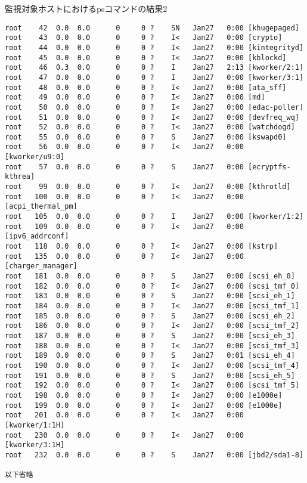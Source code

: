 \begin{itembox}[l]{監視対象ホストにおけるpsコマンドの結果2}
    \begin{verbatim}
root    42  0.0  0.0      0     0 ?    SN   Jan27   0:00 [khugepaged]
root    43  0.0  0.0      0     0 ?    I<   Jan27   0:00 [crypto]
root    44  0.0  0.0      0     0 ?    I<   Jan27   0:00 [kintegrityd]
root    45  0.0  0.0      0     0 ?    I<   Jan27   0:00 [kblockd]
root    46  0.3  0.0      0     0 ?    I    Jan27   2:13 [kworker/2:1]
root    47  0.0  0.0      0     0 ?    I    Jan27   0:00 [kworker/3:1]
root    48  0.0  0.0      0     0 ?    I<   Jan27   0:00 [ata_sff]
root    49  0.0  0.0      0     0 ?    I<   Jan27   0:00 [md]
root    50  0.0  0.0      0     0 ?    I<   Jan27   0:00 [edac-poller]
root    51  0.0  0.0      0     0 ?    I<   Jan27   0:00 [devfreq_wq]
root    52  0.0  0.0      0     0 ?    I<   Jan27   0:00 [watchdogd]
root    55  0.0  0.0      0     0 ?    S    Jan27   0:00 [kswapd0]
root    56  0.0  0.0      0     0 ?    I<   Jan27   0:00 [kworker/u9:0]
root    57  0.0  0.0      0     0 ?    S    Jan27   0:00 [ecryptfs-kthrea]
root    99  0.0  0.0      0     0 ?    I<   Jan27   0:00 [kthrotld]
root   100  0.0  0.0      0     0 ?    I<   Jan27   0:00 [acpi_thermal_pm]
root   105  0.0  0.0      0     0 ?    I    Jan27   0:00 [kworker/1:2]
root   109  0.0  0.0      0     0 ?    I<   Jan27   0:00 [ipv6_addrconf]
root   118  0.0  0.0      0     0 ?    I<   Jan27   0:00 [kstrp]
root   135  0.0  0.0      0     0 ?    I<   Jan27   0:00 [charger_manager]
root   181  0.0  0.0      0     0 ?    S    Jan27   0:00 [scsi_eh_0]
root   182  0.0  0.0      0     0 ?    I<   Jan27   0:00 [scsi_tmf_0]
root   183  0.0  0.0      0     0 ?    S    Jan27   0:00 [scsi_eh_1]
root   184  0.0  0.0      0     0 ?    I<   Jan27   0:00 [scsi_tmf_1]
root   185  0.0  0.0      0     0 ?    S    Jan27   0:00 [scsi_eh_2]
root   186  0.0  0.0      0     0 ?    I<   Jan27   0:00 [scsi_tmf_2]
root   187  0.0  0.0      0     0 ?    S    Jan27   0:00 [scsi_eh_3]
root   188  0.0  0.0      0     0 ?    I<   Jan27   0:00 [scsi_tmf_3]
root   189  0.0  0.0      0     0 ?    S    Jan27   0:01 [scsi_eh_4]
root   190  0.0  0.0      0     0 ?    I<   Jan27   0:00 [scsi_tmf_4]
root   191  0.0  0.0      0     0 ?    S    Jan27   0:00 [scsi_eh_5]
root   192  0.0  0.0      0     0 ?    I<   Jan27   0:00 [scsi_tmf_5]
root   198  0.0  0.0      0     0 ?    I<   Jan27   0:00 [e1000e]
root   199  0.0  0.0      0     0 ?    I<   Jan27   0:00 [e1000e]
root   201  0.0  0.0      0     0 ?    I<   Jan27   0:00 [kworker/1:1H]
root   230  0.0  0.0      0     0 ?    I<   Jan27   0:00 [kworker/3:1H]
root   232  0.0  0.0      0     0 ?    S    Jan27   0:00 [jbd2/sda1-8]

以下省略
    \end{verbatim}
\end{itembox}

